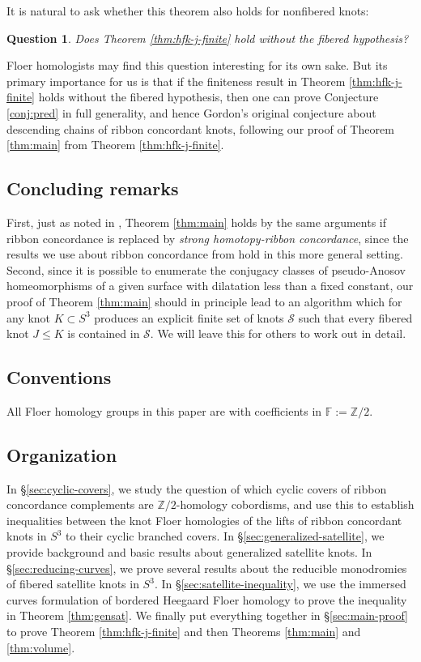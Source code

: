 \documentclass[11pt]{amsart}
\newtheorem {question}[theorem]{Question}
\numberwithin{equation}{section}
\numberwithin{theorem}{section}
\theoremstyle{definition}
\newcommand{\Z}{\mathbb{Z}}
\newcommand{\F}{\mathbb{F}}
\begin{document}
It is natural to ask whether this theorem also holds for nonfibered knots:

\begin{question}
Does Theorem \ref{thm:hfk-j-finite} hold without the \emph{fibered} hypothesis?
\end{question}

Floer homologists may find this question interesting for its own sake. But its primary importance for us is that if the finiteness result in Theorem \ref{thm:hfk-j-finite} holds without the fibered hypothesis, then one can prove Conjecture \ref{conj:pred} in full generality, and hence Gordon's original conjecture about descending chains of ribbon concordant knots, following our proof of Theorem \ref{thm:main} from Theorem \ref{thm:hfk-j-finite}.
 
\subsection{Concluding remarks} First, just as noted in \cite{bs-ribbon}, Theorem \ref{thm:main} holds by the same arguments if ribbon concordance is replaced by \emph{strong homotopy-ribbon concordance}, since the results we use about ribbon concordance from \cite{dlvvw} hold in this more general setting. Second, since it is possible to enumerate the conjugacy classes of pseudo-Anosov homeomorphisms of a given surface with dilatation less than a fixed constant, our proof of Theorem \ref{thm:main} should in principle lead to an algorithm which for any knot $K\subset S^3$ produces an explicit finite set of knots $\mathcal{S}$ such that every fibered knot $J\leq K$ is contained in $\mathcal{S}$. We will leave this for others to work out in detail.

\subsection{Conventions} All Floer homology groups in this paper are with coefficients in $\F:=\Z/2$.

\subsection{Organization}
In \S\ref{sec:cyclic-covers}, we study the question of which cyclic covers of ribbon concordance complements are  $\Z/2$-homology cobordisms, and use this to establish inequalities between the knot Floer homologies of the lifts of ribbon concordant knots in $S^3$ to  their cyclic branched covers. In \S\ref{sec:generalized-satellite}, we provide background and basic results about generalized satellite knots. In \S\ref{sec:reducing-curves}, we prove several results about the reducible monodromies of fibered satellite knots in $S^3$. In \S\ref{sec:satellite-inequality}, we use the immersed curves formulation of bordered Heegaard Floer homology to prove the inequality in Theorem \ref{thm:gensat}. We finally put everything together in \S\ref{sec:main-proof} to prove Theorem \ref{thm:hfk-j-finite} and then Theorems \ref{thm:main} and \ref{thm:volume}.
\end{document}
